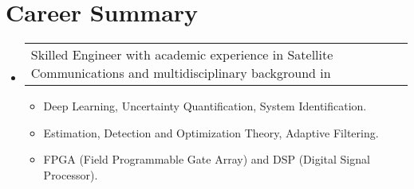 \section{Career Summary}

\begin{itemize}[leftmargin=0.15in, label={}] %
    \item   \begin{tabular*}{0.2\textwidth}{l} Skilled Engineer with academic experience in Satellite Communications and multidisciplinary background in \end{tabular*}\vspace{-7pt} %
            \begin{itemize} %
                \item{Deep Learning, Uncertainty Quantification, System Identification. \vspace{-2pt}} %
                \item{Estimation, Detection and Optimization Theory, Adaptive Filtering. \vspace{-2pt}} %
                \item{FPGA (Field Programmable Gate Array) and DSP (Digital Signal Processor). \vspace{-2pt}} %
            \end{itemize}\vspace{-5pt}
\end{itemize} %

